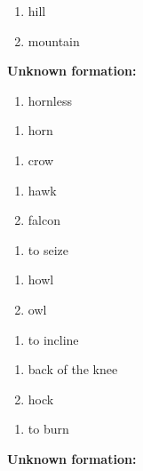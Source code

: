 \begin{enumerate}
\item hill
\item mountain
\end{enumerate}
\noindent\textbf{Unknown formation:}\\

\begin{enumerate}
\item hornless
\end{enumerate}
\begin{enumerate}
\item horn
\end{enumerate}
\begin{enumerate}
\item crow
\end{enumerate}
\begin{enumerate}
\item hawk
\item falcon
\end{enumerate}
\begin{enumerate}
\item to seize
\end{enumerate}
\begin{enumerate}
\item howl
\item owl
\end{enumerate}
\begin{enumerate}
\item to incline
\end{enumerate}
\begin{enumerate}
\item back of the knee
\item hock
\end{enumerate}
\begin{enumerate}
\item to burn
\end{enumerate}
\noindent\textbf{Unknown formation:}\\
{
}

